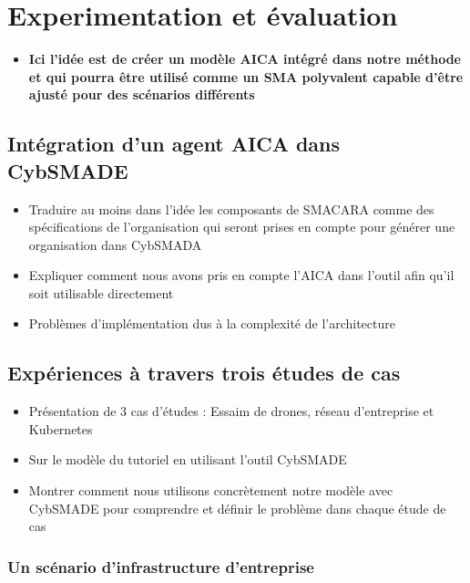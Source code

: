 \chapter{Experimentation et évaluation}\label{ch:case_studies} %

\begin{itemize}
    \item \textbf{Ici l'idée est de créer un modèle AICA intégré dans notre méthode et qui pourra être utilisé comme un SMA polyvalent capable d'être ajusté pour des scénarios différents}
\end{itemize}


\section{Intégration d'un agent AICA dans CybSMADE}
\begin{itemize}
    \item Traduire au moins dans l'idée les composants de SMACARA comme des spécifications de l'organisation qui seront prises en compte pour générer une organisation dans CybSMADA
    \item Expliquer comment nous avons pris en compte l'AICA dans l'outil afin qu'il soit utilisable directement
    \item Problèmes d'implémentation dus à la complexité de l'architecture
\end{itemize}


\section{Expériences à travers trois études de cas}
\begin{itemize}
    \item Présentation de 3 cas d'études : Essaim de drones, réseau d'entreprise et Kubernetes
    \item Sur le modèle du tutoriel en utilisant l'outil CybSMADE
    \item Montrer comment nous utilisons concrètement notre modèle avec CybSMADE pour comprendre et définir le problème dans chaque étude de cas
\end{itemize}

\subsection{Un scénario d'infrastructure d'entreprise}
